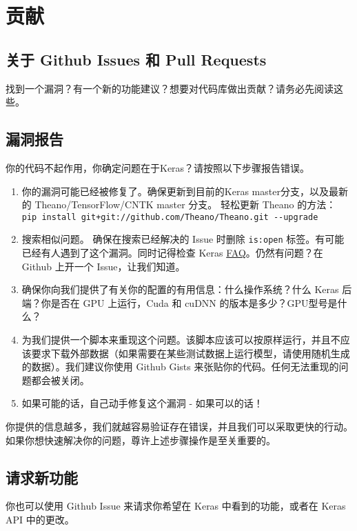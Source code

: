 \section{贡献}
\subsection{关于 Github Issues 和 Pull Requests}\label{contributing}

找到一个漏洞？有一个新的功能建议？想要对代码库做出贡献？请务必先阅读这些。

\subsection{漏洞报告}

你的代码不起作用，你确定问题在于Keras？请按照以下步骤报告错误。

\begin{enumerate}
\def\labelenumi{\arabic{enumi}.}
\item
  你的漏洞可能已经被修复了。确保更新到目前的Keras master分支，以及最新的
  Theano/TensorFlow/CNTK master 分支。 轻松更新 Theano
  的方法：\texttt{pip\ install\ git+git://github.com/Theano/Theano.git\ -\/-upgrade}
\item
  搜索相似问题。 确保在搜索已经解决的 Issue 时删除 \texttt{is:open}
  标签。有可能已经有人遇到了这个漏洞。同时记得检查 Keras
  \hyperref[keras-faq]{FAQ}。仍然有问题？在 Github 上开一个
  Issue，让我们知道。
\item
  确保你向我们提供了有关你的配置的有用信息：什么操作系统？什么 Keras
  后端？你是否在 GPU 上运行，Cuda 和 cuDNN 的版本是多少？GPU型号是什么？
\item
  为我们提供一个脚本来重现这个问题。该脚本应该可以按原样运行，并且不应该要求下载外部数据（如果需要在某些测试数据上运行模型，请使用随机生成的数据）。我们建议你使用
  Github Gists 来张贴你的代码。任何无法重现的问题都会被关闭。
\item
  如果可能的话，自己动手修复这个漏洞 - 如果可以的话！
\end{enumerate}

你提供的信息越多，我们就越容易验证存在错误，并且我们可以采取更快的行动。如果你想快速解决你的问题，尊许上述步骤操作是至关重要的。


\subsection{请求新功能}

你也可以使用 Github Issue 来请求你希望在 Keras 中看到的功能，或者在
Keras API 中的更改。


